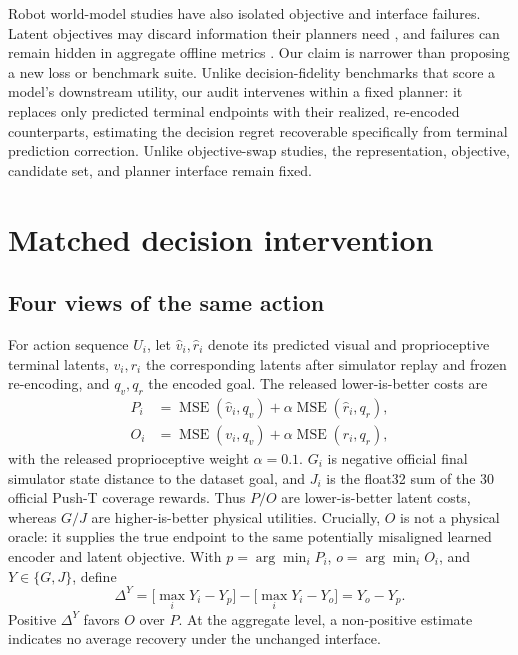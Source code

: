 \documentclass[letterpaper,10pt,conference]{ieeeconf}
\begin{document}
Robot world-model studies have also isolated objective and interface failures.
Latent objectives may discard information their planners need
\cite{singh2026objective}, and failures can remain hidden in aggregate offline
metrics \cite{vesessook2026hidden}. Our claim is narrower than proposing a new
loss or benchmark suite. Unlike decision-fidelity benchmarks that score a
model's downstream utility, our audit intervenes within a fixed planner: it
replaces only predicted terminal endpoints with their realized, re-encoded
counterparts, estimating the decision regret recoverable specifically from
terminal prediction correction. Unlike objective-swap studies, the
representation, objective, candidate set, and planner interface remain fixed.

\section{Matched decision intervention}

\subsection{Four views of the same action}

For action sequence $U_i$, let $\hat v_i,\hat r_i$ denote its predicted visual
and proprioceptive terminal latents, $v_i,r_i$ the corresponding latents after
simulator replay and frozen re-encoding, and $q_v,q_r$ the encoded goal. The
released lower-is-better costs are
\begin{equation}
\begin{aligned}
P_i&=\operatorname{MSE}(\hat v_i,q_v)
     +\alpha\operatorname{MSE}(\hat r_i,q_r),\\
O_i&=\operatorname{MSE}(v_i,q_v)
     +\alpha\operatorname{MSE}(r_i,q_r),
\end{aligned}
\label{eq:scores}
\end{equation}
with the released proprioceptive weight $\alpha=0.1$. $G_i$ is negative
official final simulator state distance to the dataset goal, and $J_i$ is the
float32 sum of the 30 official Push-T coverage rewards. Thus $P/O$ are
lower-is-better latent costs, whereas $G/J$ are higher-is-better physical
utilities. Crucially, $O$ is not a physical oracle: it supplies the true
endpoint to the same potentially misaligned learned encoder and latent
objective. With
$p=\arg\min_iP_i$, $o=\arg\min_iO_i$, and $Y\in\{G,J\}$, define
\begin{equation}
\Delta^Y = \bigl[\max_iY_i-Y_p\bigr]-\bigl[\max_iY_i-Y_o\bigr]=Y_o-Y_p.
\end{equation}
Positive $\Delta^Y$ favors $O$ over $P$. At the aggregate level, a non-positive
estimate indicates no average recovery under the unchanged interface.
\end{document}

